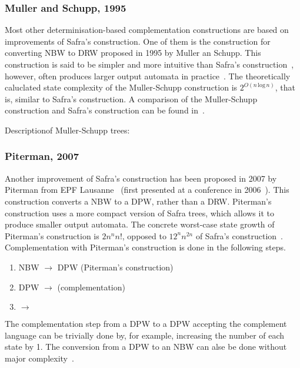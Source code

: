 \subsubsection{Muller and Schupp, 1995}

Most other determinisation-based complementation constructions are based on improvements of Safra's construction. One of them is the construction for converting NBW to DRW proposed in 1995 by Muller an Schupp. This construction is said to be simpler and more intuitive than Safra's construction~\cite{2002_roggenbach}, however, often produces larger output automata in practice~\cite{2006_althoff}. The theoretically caluclated state complexity of the Muller-Schupp construction is $2^{O\left(n\, \text{log}\, n\right)}$, that is, similar to Safra's construction. A comparison of the Muller-Schupp construction and Safra's construction can be found in~\cite{2006_althoff}.

Descriptionof Muller-Schupp trees: \cite{2006_althoff}

\subsubsection{Piterman, 2007}

Another improvement of Safra's construction has been proposed in 2007 by Piterman from EPF Lausanne~\cite{2007_piterman} (first presented at a conference in 2006~\cite{2006_piterman}). This construction converts a NBW to a DPW, rather than a DRW. Piterman's construction uses a more compact version of Safra trees, which allows it to produce smaller output automata. The concrete worst-case state growth of Piterman's construction is $2n^nn!$, opposed to $12^nn^{2n}$ of Safra's construction~\cite{2007_piterman}. Complementation with Piterman's construction is done in the following steps.
\begin{enumerate}
\item NBW           $\longrightarrow$ DPW (Piterman's construction)
\item DPW           $\longrightarrow$  (complementation)
\item {} $\longrightarrow$ 
\end{enumerate}

The complementation step from a DPW to a DPW accepting the complement language can be trivially done by, for example, increasing the number of each state by 1. The conversion from a DPW to an NBW can alse be done without major complexity~\cite{2011_tsai}.

